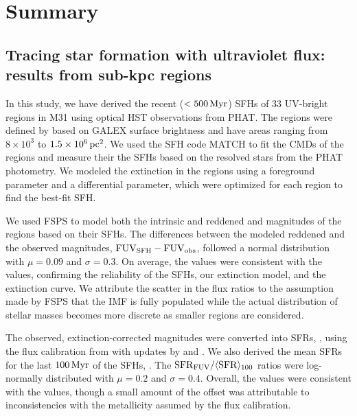 \chapter{Summary}
\label{summary}


\section{Tracing star formation with ultraviolet flux: results from sub-kpc regions}

In this study, we have derived the recent ($< 500\,\mathrm{Myr}$) SFHs of 33
UV-bright regions in M31 using optical HST observations from PHAT. The regions
were defined by  based on GALEX \fuv{} surface brightness and
have areas ranging from $8 \times 10^3$ to $1.5 \times 10^6\,\mathrm{pc}^2$. We
used the SFH code MATCH to fit the CMDs of the regions and measure their the
SFHs based on the resolved stars from the PHAT photometry. We modeled the
extinction in the regions using a foreground parameter and a differential
parameter, which were optimized for each region to find the best-fit SFH.

We used FSPS to model both the intrinsic and reddened \fuv{} and \nuv{} magnitudes of
the regions based on their SFHs. The differences between the modeled reddened
and the observed \fuv{} magnitudes, $\mathrm{FUV}_{\mathrm{SFH}} - \mathrm{FUV}_{\mathrm{obs}}$, followed a
normal distribution with $\mu=0.09$ and $\sigma=0.3$. On average, the
\fuvsfh{} values were consistent with the \fuvobs{}
values, confirming the reliability of the SFHs, our extinction model, and the
\citet{Cardelli:1989} extinction curve. We attribute the scatter in the flux
ratios to the assumption made by FSPS that the IMF is fully populated while the
actual distribution of stellar masses becomes more discrete as smaller regions
are considered.

The observed, extinction-corrected \fuv{} magnitudes were converted into SFRs,
\sfrfuv{}, using the \fuv{} flux calibration from \citet{Kennicutt:1998}
with updates by \citet{Hao:2011} and \citet{Murphy:2011}. We also derived the mean
SFRs for the last $100\,\mathrm{Myr}$ of the SFHs, \sfroneh{}. The $\mathrm{SFR}_{\mathrm{FUV}} / \langle\mathrm{SFR}\rangle_{100}$
ratios were log-normally distributed with $\mu=0.2$
and $\sigma=0.4$. Overall, the \sfrfuv{} values were consistent with
the \sfroneh{} values, though a small amount of the
offset was attributable to inconsistencies with the metallicity assumed by the
flux calibration.

